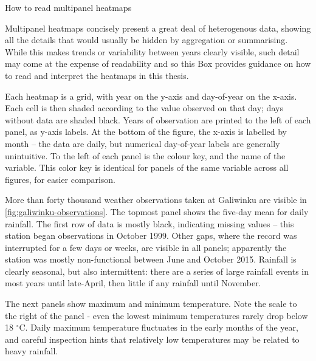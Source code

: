 \begin{framedbox}
\caption[How to read multipanel heatmaps]{How to read multipanel heatmaps}
\label{fig:how-read-multipanel}
    \setlength{\parskip}{4pt}
    \setlength{\parindent}{18pt}

    Multipanel heatmaps concisely present a great deal of heterogenous data,
    showing all the details that would usually be hidden by aggregation or
    summarising.  While this makes trends or variability between years clearly
    visible, such detail may come at the expense of readability and so this
    Box provides guidance on how to read and interpret the heatmaps in this thesis.

    Each heatmap is a grid, with year on the y-axis and day-of-year on the
    x-axis.  Each cell is then shaded according
    to the value observed on that day; days  without data are shaded black.
    Years of observation are printed to the left of each panel, as y-axis labels.
    At the bottom of the figure, the x-axis is labelled by month -- the data
    are daily, but numerical day-of-year labels are generally unintuitive.
    To the left of each panel is the colour key, and the name of the variable.
    This color key is identical for panels of the same variable across all
    figures, for easier comparison.

    More than forty thousand  weather observations taken at Galiwinku are
    visible in \cref{fig:galiwinku-observations}.
    The topmost panel shows the five-day mean for daily rainfall.
    The first row of data is mostly black, indicating missing
    values -- this station began observations in October 1999.  Other gaps,
    where the record was interrupted for a few days or weeks, are visible in
    all panels; apparently the station was mostly non-functional between June
    and October 2015.
    Rainfall is clearly seasonal, but also intermittent:  there are a series
    of large rainfall events in most years until late-April, then little if any
    rainfall until November.

    The next panels show maximum and minimum temperature.  Note the scale to
    the right of the panel - even the lowest minimum temperatures rarely drop
    below 18 $^\circ$C.  Daily maximum temperature fluctuates in the
    early months of the year, and careful inspection hints that relatively
    low temperatures may be related to heavy rainfall.


\end{framedbox}
